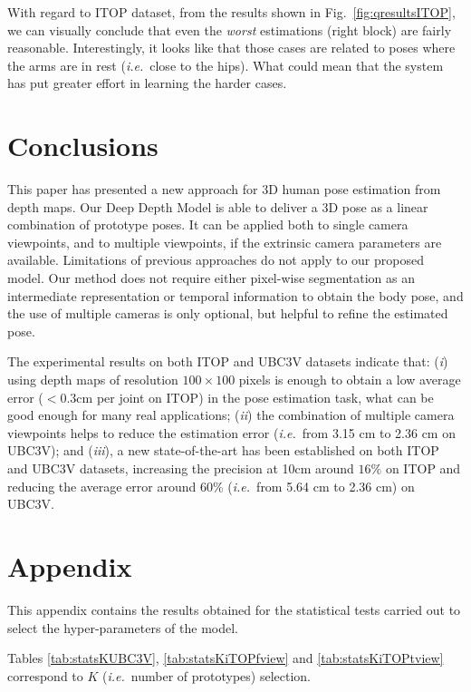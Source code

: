 \documentclass[review,12pt,3p]{elsarticle}
\def \ie{\textit{i.e.}}
\begin{document}
With regard to ITOP dataset, from the results shown in Fig.~\ref{fig:qresultsITOP}, we can visually conclude that even the \textit{worst} estimations (right block) are fairly reasonable. Interestingly, it looks like that those cases are related to poses where the arms are in rest (\ie~close to the hips). What could mean that the system has put greater effort in learning the harder cases.


\section{Conclusions}\label{sec:conclus}
%
This paper has presented a new approach for 3D human pose estimation from depth maps. Our Deep Depth Model is able to deliver a 3D pose as a linear combination of prototype poses. It can be applied both to single camera viewpoints, and to multiple viewpoints, if the extrinsic camera parameters are available.
%
Limitations of previous approaches do not apply to our proposed model. Our method does not require either pixel-wise segmentation as an intermediate representation or temporal information to obtain the body pose, and the use of multiple cameras is only optional, but helpful to refine the estimated pose.

The experimental results on both ITOP and UBC3V datasets indicate that: 
(\textit{i}) using depth maps of resolution $100\times100$ pixels is enough to obtain a low average error ($<0.3$cm per joint on ITOP) in the pose estimation task, what can be good enough for many real applications;  
(\textit{ii}) the combination of multiple camera viewpoints helps to reduce the estimation error (\ie~from 3.15 cm to 2.36 cm on UBC3V); and (\textit{iii}), a new state-of-the-art has been established on both ITOP and UBC3V datasets, increasing the precision at 10cm around $16\%$ on ITOP and reducing the average error around $60\%$ (\ie~from 5.64 cm to 2.36 cm) on UBC3V.
%

\section*{Appendix} \label{sec:appendix}
%
This appendix contains the results obtained for the statistical tests carried out to select the hyper-parameters of the model.

Tables \ref{tab:statsKUBC3V}, \ref{tab:statsKiTOPfview} and \ref{tab:statsKiTOPtview} correspond to $K$ (\ie~number of prototypes) selection.
\end{document}
